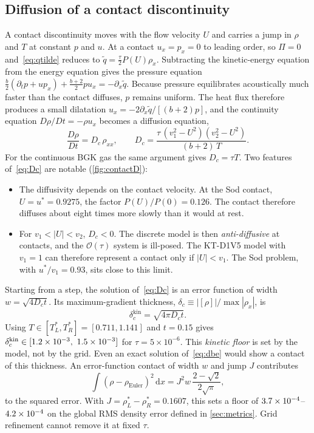 \documentclass[11pt]{article}
\theoremstyle{remark}
\newcommand{\dd}{\mathrm{d}}
\newcommand{\ord}{\mathcal{O}}
\begin{document}
\subsection{Diffusion of a contact discontinuity}
\label{sec:contact_diffusion}

A contact discontinuity moves with the flow velocity $U$ and carries a jump in $\rho$
and $T$ at constant $p$ and $u$.  At a contact $u_x = p_x = 0$ to leading order, so
$\Pi = 0$ and~\eqref{eq:qtilde} reduces to $\tilde q = \tfrac{\tau}{2}P(U)\rho_x$.
Subtracting the kinetic-energy equation from the energy equation gives the
pressure equation
$\tfrac{b}{2}(\partial_t p + up_x) + \tfrac{b+2}{2}pu_x = -\partial_x\tilde q$.
Because pressure equilibrates acoustically much faster than the contact diffuses,
$p$ remains uniform.  The heat flux therefore produces a small dilatation
$u_x = -2\partial_x\tilde q/[(b+2)p]$, and the continuity equation
$D\rho/Dt = -\rho u_x$ becomes a diffusion equation,
\begin{equation}
  \frac{D\rho}{Dt} = D_c\,\rho_{xx},\qquad
  D_c = \frac{\tau\,(v_1^2 - U^2)(v_2^2 - U^2)}{(b+2)\,T}.
  \label{eq:Dc}
\end{equation}
For the continuous BGK gas the same argument gives $D_c = \tau T$.  Two features
of~\eqref{eq:Dc} are notable (\cref{fig:contactD}):
\begin{itemize}
  \item The diffusivity depends on the contact velocity.  At the Sod contact,
        $U = u^* = 0.9275$, the factor $P(U)/P(0) = 0.126$.  The contact therefore
        diffuses about eight times more slowly than it would at rest.
  \item For $v_1 < |U| < v_2$, $D_c<0$.  The discrete model is then
        \emph{anti-diffusive} at contacts, and the $\ord(\tau)$ system is ill-posed.
        The KT-D1V5 model with $v_1 = 1$ can therefore represent a contact only
        if $|U|<v_1$.  The Sod problem, with $u^*/v_1 = 0.93$, sits close to this limit.
\end{itemize}
Starting from a step, the solution of~\eqref{eq:Dc} is an error function of width
$w = \sqrt{4D_ct}$.  Its maximum-gradient thickness, $\delta_c \equiv |[\rho]|/\max|\rho_x|$, is
\begin{equation}
  \delta_c^{\mathrm{kin}} = \sqrt{4\pi D_c t}.
  \label{eq:dkin}
\end{equation}
Using $T\in[T^*_L,T^*_R] = [0.711,1.141]$ and $t = 0.15$ gives
$\delta_c^{\mathrm{kin}} \in [1.2\times10^{-3},\ 1.5\times10^{-3}]$ for $\tau = 5\times10^{-6}$.
This \emph{kinetic floor} is set by the model, not by the grid.  Even an exact
solution of~\eqref{eq:dbe} would show a contact of this thickness.  An error-function
contact of width $w$ and jump $J$ contributes
\begin{equation}
  \int (\rho-\rho_{\mathrm{Euler}})^2\,\dd x = J^2 w\,\frac{2-\sqrt2}{2\sqrt\pi},
  \label{eq:erf_l2}
\end{equation}
to the squared error.  With $J=\rho^*_L-\rho^*_R = 0.1607$, this sets a floor
of $3.7\times10^{-4}$--$4.2\times10^{-4}$ on the global RMS density error defined in
\cref{sec:metrics}.  Grid refinement cannot remove it at fixed $\tau$.
\end{document}
